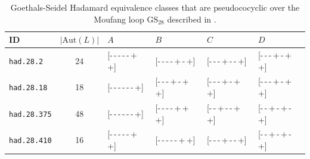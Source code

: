 \documentclass[11pt,a4paper]{article}
\begin{document}
\begin{table}[ht]
\centering
\caption{Goethals-Seidel Hadamard equivalence classes that are pseudococyclic over the Moufang loop $\mathrm{GS}_{28}$ described in \citep{Alvarez2020}.}
\label{tab:28}
\begin{tabular}{@{}lcllll}
\toprule
\textbf{ID \citep{Sloane}} &  \textbf{$|\mathrm{Aut}(L)|$} & $A$ & $B$ & $C$ & $D$ \\ \midrule
\texttt{had.28.2} & 24 & [-\,-\,-\,-\,-\,+\,+] & [-\,-\,-\,-\,+\,-\,+] & [-\,-\,-\,+\,-\,-\,+] & [-\,-\,-\,+\,-\,+\,+]\\
\texttt{had.28.18} & 18 & [-\,-\,-\,-\,-\,-\,+] & [-\,-\,-\,+\,-\,+\,+] & [-\,-\,-\,+\,-\,+\,+]& [-\,-\,-\,+\,-\,+\,+]\\
\texttt{had.28.375} & 48 & [-\,-\,-\,-\,-\,-\,+] & [-\,-\,-\,-\,+\,+\,+] & [-\,-\,+\,-\,-\,+\,+]& [-\,-\,+\,-\,+\,-\,+]\\
\texttt{had.28.410} & 16 & [-\,-\,-\,-\,-\,+\,+] & [-\,-\,-\,-\,-\,+\,+] & [-\,-\,-\,+\,-\,-\,+] & [-\,-\,+\,-\,+\,-\,+]\\
\bottomrule
\end{tabular}
\end{table}
\end{document}
